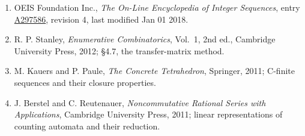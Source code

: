 \documentclass[11pt]{article}
\theoremstyle{definition}
\begin{document}
\begin{enumerate}

\item OEIS Foundation Inc., \emph{The On-Line Encyclopedia of Integer Sequences}, entry \href{https://oeis.org/A297586}{A297586}, revision 4, last modified Jan 01 2018.

\item R. P. Stanley, \emph{Enumerative Combinatorics}, Vol.~1, 2nd ed., Cambridge University Press, 2012; \S4.7, the transfer-matrix method.

\item M. Kauers and P. Paule, \emph{The Concrete Tetrahedron}, Springer, 2011; C-finite sequences and their closure properties.

\item J. Berstel and C. Reutenauer, \emph{Noncommutative Rational Series with Applications}, Cambridge University Press, 2011; linear representations of counting automata and their reduction.

\end{enumerate}
\end{document}
